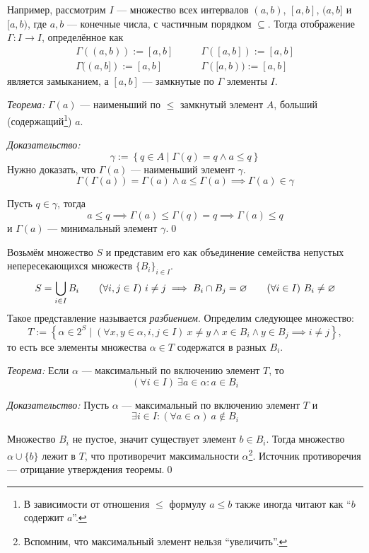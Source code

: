 Например, рассмотрим $I$ --- множество всех интервалов $(a,b)$, $[a,b]$, $(a,b]$
и $[a,b)$, где $a,b$ --- конечные числа, с частичным порядком $\subseteq$.
Тогда отображение $\Gamma:I\to I$, определённое как
\[\begin{array}{ll}
	\Gamma((a,b)):=[a,b]\qquad &\Gamma([a,b]):=[a,b]\\
	\Gamma((a,b]):=[a,b]\qquad &\Gamma([a,b)):=[a,b]
\end{array}
\]
является замыканием, а $[a,b]$ --- замкнутые по $\Gamma$ элементы $I$.

\vspace{1em}
{\it Теорема:} $\Gamma(a)$ --- наименьший по $\leq$ замкнутый элемент $A$,
больший (содержащий\footnote{В зависимости от отношения $\leq$ формулу
$a\leq b$ также иногда читают как ``$b$ содержит $a$''.}) $a$.

{\it Доказательство:}
\[
	\gamma:=\left\{q\in A\;\big|\; \Gamma(q)=q\land a\leq q\right\}
\]
Нужно доказать, что $\Gamma(a)$ --- наименьший элемент $\gamma$.
\[
	\Gamma(\Gamma(a))=\Gamma(a)\land a\leq\Gamma(a)\implies\Gamma(a)\in\gamma
\]

Пусть $q\in \gamma$, тогда
\[
	a\leq q\implies \Gamma(a)\leq\Gamma(q)=q\implies\Gamma(a)\leq q
\]
и $\Gamma(a)$ --- минимальный элемент $\gamma$.\qed

Возьмём множество $S$ и представим его как объединение семейства непустых
непересекающихся множеств $\{B_{i}\}_{i\in I}$.
\[
	S=\bigcup_{i\in I}B_{i}\qquad
	(\forall i,j\in I)~i\neq j\implies B_{i}\cap B_{j}=\varnothing\qquad
	(\forall i\in I)~B_{i}\neq\varnothing
\]
Такое представление называется {\it разбиением}.
Определим следующее множество:
\[
	T:=\left\{\alpha\in 2^{S}\;\big|\; (\forall x,y\in\alpha,i,j\in I)~
	x\neq y\land	x\in B_{i}\land y\in B_{j}\implies i\neq j\right\},
\]
то есть все элементы множества $\alpha\in T$ содержатся в разных $B_{i}$.

\vspace{1em}
{\it Теорема:} Если $\alpha$ --- максимальный по включению элемент $T$, то
\[
	(\forall i\in I)~\exists a\in\alpha:a\in B_{i}
\]

{\it Доказательство:}
Пусть $\alpha$ --- максимальный по включению элемент $T$ и
\[
	\exists i\in I:(\forall a\in\alpha)~a\notin B_{i}
\]

Множество $B_{i}$ не пустое, значит существует элемент $b\in B_{i}$.
Тогда множество $\alpha\cup \{b\}$ лежит в $T$, что противоречит
максимальности $\alpha$\footnote{Вспомним, что максимальный элемент
нельзя ``увеличить''.}.
Источник противоречия --- отрицание утверждения теоремы.\qed

